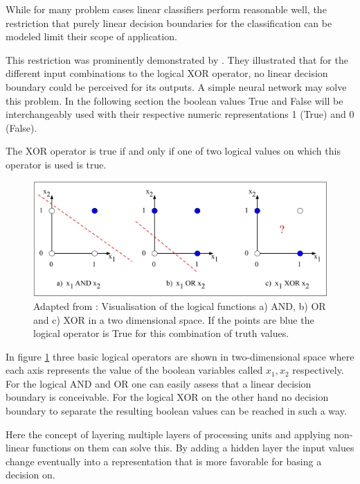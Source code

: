 While for many problem cases linear classifiers perform reasonable well, 
the restriction that purely linear decision boundaries for the classification can be modeled limit their scope of application.

This restriction was prominently demonstrated by \citet{MinskyPerceptrons}. They illustrated that for the different input combinations to the logical XOR operator, no linear decision boundary could be perceived for its outputs. A simple neural network may solve this problem. 
In the following section the boolean values True and False will be interchangeably used with their respective numeric representations 1 (True) and 0 (False).

The XOR operator is true if and only if one of two logical values on which this operator is used is true.

\begin{figure}[H]
  \includegraphics[width=\linewidth]{Pictures/Jurafsky_21_XOR_1.png}
  \caption{Adapted from \citet{jurafsky2021}: Visualisation of the logical functions a) AND, b) OR and c) XOR in a two dimensional space. If the points are blue the logical operator is True for this combination of truth values.}
  \label{fig:XOR1}
\end{figure}

In figure \ref{fig:XOR1}  three basic logical operators are shown in two-dimensional space where each axis represents the value of the boolean variables called $x_1, x_2$ respectively.
For the logical AND and OR one can easily assess that a linear decision boundary is conceivable. 
For the logical XOR on the other hand no decision boundary to separate the resulting boolean values can be reached in such a way.

Here the concept of layering multiple layers of processing units and applying non-linear functions on them can solve this. 
By adding a hidden layer the input values change eventually into a representation that is more favorable for basing a decision on.

